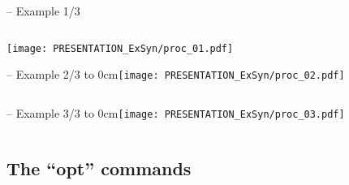 \begin{frame}[fragile]{\subsecname{} -- Example 1/3}
\begin{columns}
\column[t]{5cm}

\column[t]{5cm}

\end{columns}
\hfil\texttt{[image: PRESENTATION\_ExSyn/proc\_01.pdf]}
\end{frame}

\begin{frame}[t, fragile]{\subsecname{} -- Example 2/3}
\vbox to 0cm{\texttt{[image: PRESENTATION\_ExSyn/proc\_02.pdf]}\vss}
\vskip-1cm
\begin{columns}
\column[t]{5cm}

\column[t]{5cm}

\end{columns}
\end{frame}

\begin{frame}[t, fragile]{\subsecname{} -- Example 3/3}
\vbox to 0cm{\texttt{[image: PRESENTATION\_ExSyn/proc\_03.pdf]}\vss}
\vskip-1cm
\begin{columns}
\column[t]{5cm}

\column[t]{5cm}

\end{columns}
\end{frame}


\subsection{The ``opt'' commands}

